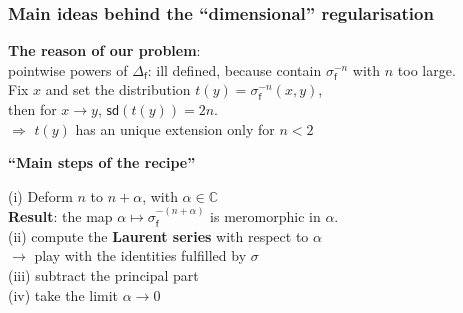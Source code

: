\documentclass[9pt]{beamer}
\newcommand{\sd}{\mathsf{sd}} %
\newcommand{\Cbb}{\mathbb{C}}
\newcommand{\fsf}{\mathsf{f}}
\begin{document}

\begin{frame}

\frametitle{Main ideas behind the ``dimensional'' regularisation}

\vfill

\textbf{The reason of our problem}: \\
pointwise powers of $\Delta_\fsf$: ill defined, because contain $\sigma_\fsf^{-n}$ with $n$ too large. \\
Fix $x$ and set the distribution $t(y) = \sigma_\fsf^{-n}(x,y)$, \\
then for $x \to y$, $\sd(t(y)) = 2n$. \\
$\Rightarrow$ $t(y)$ has an unique extension only for $n < 2$

\vfill

\textbf{``Main steps of the recipe''}

(i) Deform $n$ to $n + \alpha$, with $\alpha \in \Cbb$ \\

\qquad \textbf{Result}: the map $\alpha \mapsto \sigma_\fsf^{-(n+\alpha)}$ is meromorphic in $\alpha$. \\ 
 
(ii) compute the \textbf{Laurent series} with respect to $\alpha$ \\
\qquad $\to$ play with the identities fulfilled by $\sigma$ \\
 
(iii) subtract the principal part \\
 
(iv) take the limit $\alpha \to 0$ \\

\vfill

\end{frame}

\end{document}

